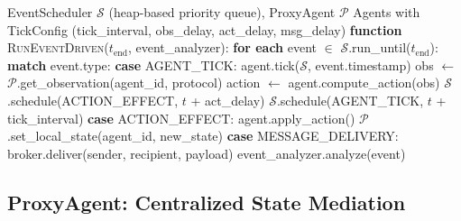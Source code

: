 \documentclass{article}
\begin{document}
\begin{algorithm}[t]
\caption{Event-driven execution via \texttt{EventScheduler}}
\label{alg:event-driven}
\begin{algorithmic}[1]
\REQUIRE EventScheduler $\mathcal{S}$ (heap-based priority queue), ProxyAgent $\mathcal{P}$
\REQUIRE Agents with TickConfig (tick\_interval, obs\_delay, act\_delay, msg\_delay)
\STATE
\STATE \textbf{function} \textsc{RunEventDriven}($t_\text{end}$, event\_analyzer):
\STATE \hspace{0.5cm} \textbf{for each} event $\in$ $\mathcal{S}$.run\_until($t_\text{end}$):
\STATE \hspace{1.0cm} \textbf{match} event.type:
\STATE
\STATE \hspace{1.0cm} \textbf{case} AGENT\_TICK:
\STATE \hspace{1.5cm} agent.tick($\mathcal{S}$, event.timestamp) 
\STATE \hspace{1.5cm} obs $\gets$ $\mathcal{P}$.get\_observation(agent\_id, protocol) 
\STATE \hspace{1.5cm} action $\gets$ agent.compute\_action(obs) 
\STATE \hspace{1.5cm} $\mathcal{S}$.schedule(ACTION\_EFFECT, $t$ + act\_delay)
\STATE \hspace{1.5cm} $\mathcal{S}$.schedule(AGENT\_TICK, $t$ + tick\_interval) 
\STATE
\STATE \hspace{1.0cm} \textbf{case} ACTION\_EFFECT:
\STATE \hspace{1.5cm} agent.apply\_action() 
\STATE \hspace{1.5cm} $\mathcal{P}$.set\_local\_state(agent\_id, new\_state)
\STATE
\STATE \hspace{1.0cm} \textbf{case} MESSAGE\_DELIVERY:
\STATE \hspace{1.5cm} broker.deliver(sender, recipient, payload)
\STATE
\STATE \hspace{1.0cm} event\_analyzer.analyze(event) 
\end{algorithmic}
\end{algorithm}

\subsection{ProxyAgent: Centralized State Mediation}
\label{sec:proxy}
\end{document}
